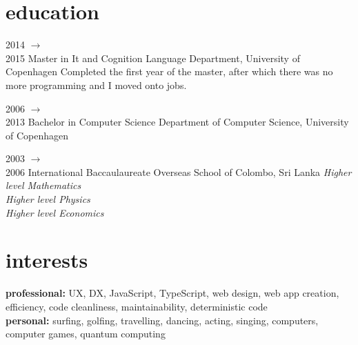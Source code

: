 \documentclass[]{friggeri-cv} %
\begin{document}
\section{education}

\begin{entrylist}


\entry
{2014 $\rightarrow$ \\ 2015}
{Master {\normalfont in It and Cognition}}
{Language Department, University of Copenhagen}
{Completed the first year of the master, after which there was no more programming and I moved onto jobs.}


\entry
{2006 $\rightarrow$ \\ 2013}
{Bachelor {\normalfont in Computer Science}}
{Department of Computer Science, University of Copenhagen}
{}


\entry
{2003 $\rightarrow$ \\ 2006}
{International Baccaulaureate}
{Overseas School of Colombo, Sri Lanka}
{\textit{Higher level Mathematics} \\
\textit{Higher level Physics} \\
\textit{Higher level Economics} }


\end{entrylist}




\section{interests}

\textbf{professional:} UX, DX, JavaScript, TypeScript, web design, web app creation, efficiency, code cleanliness, maintainability, deterministic code \\
\textbf{personal:} surfing, golfing, travelling, dancing, acting, singing, computers, computer games, quantum computing
\end{document}
